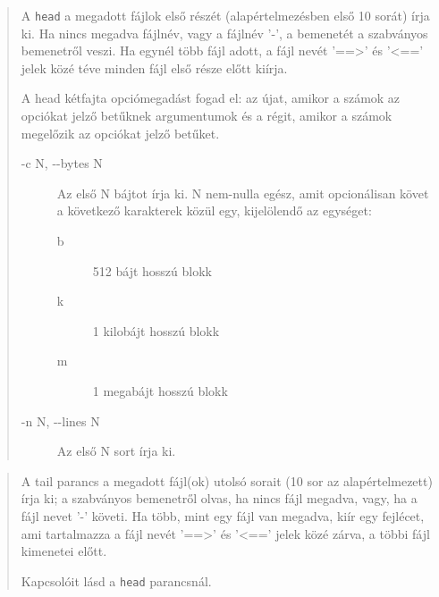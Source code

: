 \noindent{}
\begin{quotation}
A  \texttt{head}  a  megadott fájlok  első részét (alapértelmezésben első 10 sorát) írja ki. Ha nincs megadva fájlnév, vagy a fájlnév '-', a bemenetét  a  szabványos  bemenetről  veszi.  Ha  egynél  több fájl adott, a fájl nevét '==>' és '<=='
       jelek közé téve minden fájl első része előtt kiírja.
\bigskip

     A head kétfajta opciómegadást fogad el: az újat,  amikor  a  számok  az
       opciókat  jelző  betűknek  argumentumok  és  a  régit,  amikor a számok
       megelőzik az opciókat jelző betűket.

      \begin{description}
       \item[-c N, -{}-bytes N]
         Az első N bájtot írja ki. N nem-nulla egész,  amit  opcionálisan
              követ a következő karakterek közül egy, kijelölendő az egységet:

	    \begin{description}
	     \item[b] 512 bájt hosszú blokk
             \item[k] 1 kilobájt hosszú blokk
             \item[m] 1 megabájt hosszú blokk
	    \end{description}

      \item[-n N, -{}-lines N]
              Az első N sort írja ki.
      \end{description}
 
     
\end{quotation}

\noindent{}

\begin{quotation}
 A tail parancs a megadott fájl(ok) utolsó sorait (10 sor  az  alapértelmezett) írja ki; a szabványos bemenetről olvas, ha nincs fájl megadva, vagy, ha
       a fájl nevet '-' követi.  Ha több, mint egy fájl van megadva, kiír  egy fejlécet, ami tartalmazza a fájl nevét '==>' és '<==' jelek közé zárva,
       a többi fájl kimenetei előtt.

  Kapcsolóit lásd a \texttt{head} parancsnál.
\end{quotation}



